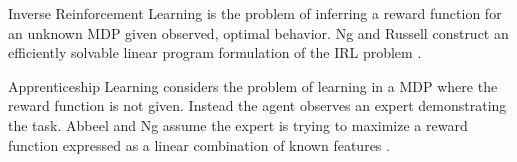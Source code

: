 \documentclass{article} %
\begin{document}
Inverse Reinforcement Learning is the problem of inferring a reward function for an unknown MDP given observed, optimal behavior. Ng and Russell construct an efficiently solvable linear program formulation of the IRL problem \cite{ng00}.

Apprenticeship Learning considers the problem of learning in a MDP where the reward function is not given. Instead the agent observes an expert demonstrating the task. Abbeel and Ng assume the expert is trying to maximize a reward function expressed as a linear combination of known features \cite{abbeel04}. 



\end{document}
